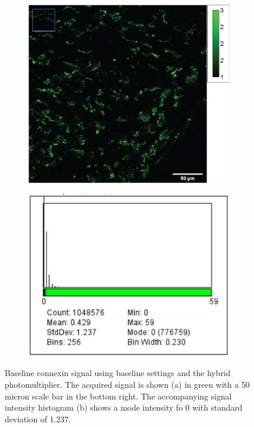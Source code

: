 \documentclass[12pt]{article}
\begin{document}
\begin{figure}
	\begin{subfigure}{.5\textwidth}
		\centering
		\includegraphics[width=.95\linewidth]{FinalFigures/CX43_Baseline.png}
		\caption{}
		\label{fig:cx43_b}
	\end{subfigure}%
	\begin{subfigure}{.5\textwidth}
		\centering
		\includegraphics[width=.95\linewidth]{FinalFigures/CX43_baseline_Hist.png}
		\caption{}
		\label{fig:cx43_b_hist}
	\end{subfigure}
	\caption{Baseline connexin signal using baseline settings and the hybrid photomultiplier. The acquired signal is shown (a) in green with a 50 micron scale bar in the bottom right. The accompanying signal intensity histogram (b) shows a mode intensity fo 0 with standard deviation of 1.237.}
	\label{fig:cx43_base}
\end{figure}




\end{document}
